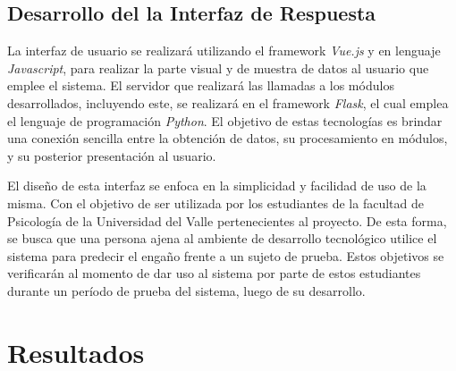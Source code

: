 \section{Desarrollo del la Interfaz de Respuesta}
La interfaz de usuario se realizará utilizando el framework \textit{Vue.js} y en lenguaje \textit{Javascript}, para realizar la parte visual y de muestra de datos al usuario que emplee el sistema. El servidor que realizará las llamadas a los módulos desarrollados, incluyendo este, se realizará en el framework \textit{Flask}, el cual emplea el lenguaje de programación \textit{Python}. El objetivo de estas tecnologías es brindar una conexión sencilla entre la obtención de datos, su procesamiento en módulos, y su posterior presentación al usuario.

El diseño de esta interfaz se enfoca en la simplicidad y facilidad de uso de la misma. Con el objetivo de ser utilizada por los estudiantes de la facultad de Psicología de la Universidad del Valle pertenecientes al proyecto. De esta forma, se busca que una persona ajena al ambiente de desarrollo tecnológico utilice el sistema para predecir el engaño frente a un sujeto de prueba. Estos objetivos se verificarán al momento de dar uso al sistema por parte de estos estudiantes durante un período de prueba del sistema, luego de su desarrollo.


\chapter{Resultados}

